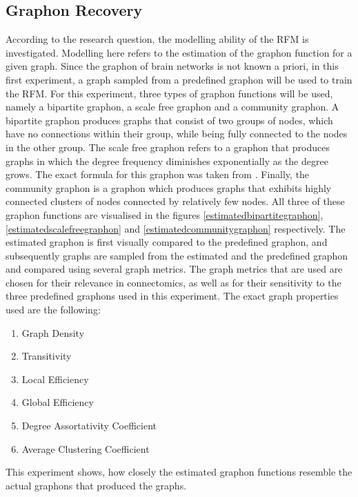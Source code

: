 \documentclass[11pt]{report} %
\begin{document}
\subsection{Graphon Recovery} \label{provengraphonexperiment}
According to the research question, the modelling ability of the RFM is investigated. 
Modelling here refers to the estimation of the graphon function for a given graph. 
Since the graphon of brain networks is not known a priori, in this first experiment, a graph sampled from a predefined graphon will be used to train the RFM.
For this experiment, three types of graphon functions will be used, namely a bipartite graphon, a scale free graphon and a community graphon.
A bipartite graphon produces graphs that consist of two groups of nodes, which have no connections within their group, while being fully connected to the nodes in the other group.
The scale free graphon refers to a graphon that produces graphs in which the degree frequency diminishes exponentially as the degree grows. The exact formula for this graphon was taken from .
Finally, the community graphon is a graphon which produces graphs that exhibits highly connected clusters of nodes connected by relatively few nodes.
All three of these graphon functions are visualised in the figures \ref{estimatedbipartitegraphon}, \ref{estimatedscalefreegraphon} and \ref{estimatedcommunitygraphon} respectively.
The estimated graphon is first visually compared to the predefined graphon, and subsequently graphs are sampled from the estimated and the predefined graphon and compared using several graph metrics.
The graph metrics that are used are chosen for their relevance in connectomics, as well as for their sensitivity to the three predefined graphons used in this experiment.
The exact graph properties used are the following:
\begin{enumerate}
    \item Graph Density 
    \item Transitivity 
    \item Local Efficiency \cite{rubinov2010, betzel2022}
    \item Global Efficiency \cite{rubinov2010, betzel2022}
    \item Degree Assortativity Coefficient 
    \item Average Clustering Coefficient
\end{enumerate}
This experiment shows, how closely the estimated graphon functions resemble the actual graphons that produced the graphs.
\end{document}
